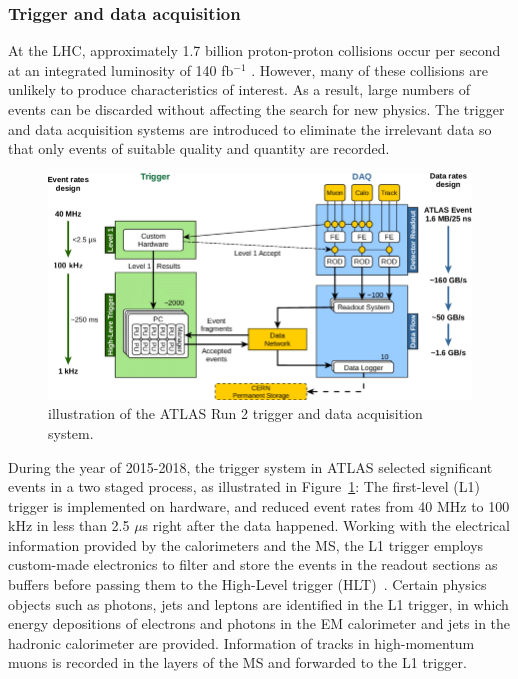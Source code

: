 \documentclass[UTF8,12pt]{ctexart}
\numberwithin{equation}{section}
\def\ifb{fb$^{-1}$ }
\begin{document}
\subsubsection{Trigger and data acquisition}
\label{sec:3.2.4}

At the LHC, approximately 1.7 billion proton-proton collisions occur per second at an integrated luminosity of 140 \ifb. However, many of these collisions are unlikely to produce characteristics of interest. As a result, large numbers of events can be discarded without affecting the search for new physics. The trigger and data acquisition systems are introduced to eliminate the irrelevant data so that only events of suitable quality and quantity are recorded.

\begin{figure}[htb] 
	\centering  
	\includegraphics[width=16cm]{./fig/dq.png}	\caption{illustration of the ATLAS  Run 2 trigger and data acquisition system.}
	\label{Fig.dq}
\end{figure}

During the year of 2015-2018, the trigger system in ATLAS selected significant events in a two staged process, as illustrated in Figure~\ref{Fig.dq}: The first-level (L1) trigger is implemented on hardware, and reduced event rates from 40 MHz to 100 kHz in less than 2.5 $\mu$s right after the data happened. Working with the electrical information provided by the calorimeters and the MS, the L1 trigger employs custom-made electronics to filter and store the events in the readout sections as buffers before passing them to the High-Level trigger (HLT)~\cite{TRIG-2016-01}. Certain physics objects such as photons, jets and leptons are identified in the L1 trigger, in which energy depositions of electrons and photons in the EM calorimeter and jets in the hadronic calorimeter are provided. Information of tracks in high-momentum muons is recorded in the layers of the MS and forwarded to the L1 trigger.
\end{document}
